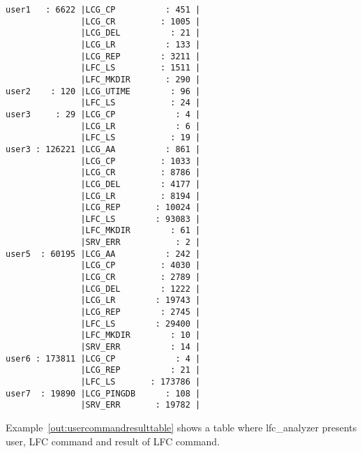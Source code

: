 \documentclass[a4paper, 11pt]{article} %
\begin{document}
\newpage

\begin{center}
\begin{lstlisting}[style=cli, label={out:usercommandtable}, caption={lfc\_analyzer -i logfile -u -c}]
user1   : 6622 |LCG_CP          : 451 |
               |LCG_CR         : 1005 |
               |LCG_DEL          : 21 |
               |LCG_LR          : 133 |
               |LCG_REP        : 3211 |
               |LFC_LS         : 1511 |
               |LFC_MKDIR       : 290 |
user2    : 120 |LCG_UTIME        : 96 |
               |LFC_LS           : 24 |
user3     : 29 |LCG_CP            : 4 |
               |LCG_LR            : 6 |
               |LFC_LS           : 19 |
user3 : 126221 |LCG_AA          : 861 |
               |LCG_CP         : 1033 |
               |LCG_CR         : 8786 |
               |LCG_DEL        : 4177 |
               |LCG_LR         : 8194 |
               |LCG_REP       : 10024 |
               |LFC_LS        : 93083 |
               |LFC_MKDIR        : 61 |
               |SRV_ERR           : 2 |
user5  : 60195 |LCG_AA          : 242 |
               |LCG_CP         : 4030 |
               |LCG_CR         : 2789 |
               |LCG_DEL        : 1222 |
               |LCG_LR        : 19743 |
               |LCG_REP        : 2745 |
               |LFC_LS        : 29400 |
               |LFC_MKDIR        : 10 |
               |SRV_ERR          : 14 |
user6 : 173811 |LCG_CP            : 4 |
               |LCG_REP          : 21 |
               |LFC_LS       : 173786 |
user7  : 19890 |LCG_PINGDB      : 108 |
               |SRV_ERR       : 19782 |
\end{lstlisting}
\end{center}

\newpage

Example~\ref{out:usercommandresulttable} shows a table where lfc\_analyzer presents user, LFC command and result of LFC command.
\end{document}
